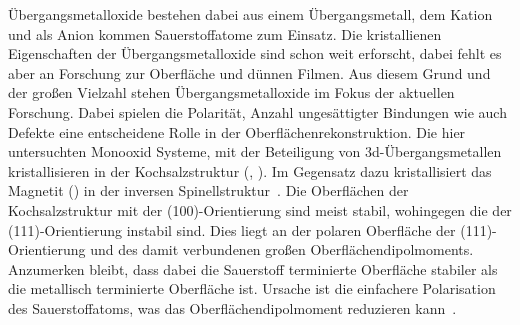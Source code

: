         Übergangsmetalloxide bestehen dabei aus einem Übergangsmetall, dem Kation und als Anion kommen Sauerstoffatome zum Einsatz.
        Die kristallienen Eigenschaften der Übergangsmetalloxide sind schon weit erforscht, dabei fehlt es aber an Forschung zur Oberfläche und dünnen Filmen.
        Aus diesem Grund und der großen Vielzahl stehen Übergangsmetalloxide im Fokus der aktuellen Forschung.
        Dabei spielen die Polarität, Anzahl ungesättigter Bindungen wie auch Defekte eine entscheidene Rolle in der Oberflächenrekonstruktion.
        Die hier untersuchten Monooxid Systeme, mit der Beteiligung von 3d-Übergangsmetallen kristallisieren in der Kochsalzstruktur (, ).
        Im Gegensatz dazu kristallisiert das Magnetit () in der inversen Spinellstruktur~\cite{IF_5}.
        Die Oberflächen der Kochsalzstruktur mit der (100)-Orientierung sind meist stabil, wohingegen die der (111)-Orientierung instabil sind.
        Dies liegt an der polaren Oberfläche der (111)-Orientierung und des damit verbundenen großen Oberflächendipolmoments.
        Anzumerken bleibt, dass dabei die Sauerstoff terminierte Oberfläche stabiler als die metallisch terminierte Oberfläche ist.
        Ursache ist die einfachere Polarisation des Sauerstoffatoms, was das Oberflächendipolmoment reduzieren kann~\cite{al-abadleh_oxide_2003}.

